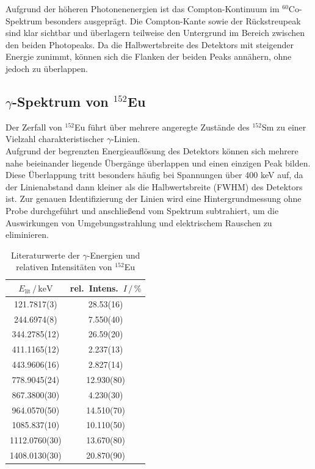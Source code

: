 Aufgrund der höheren Photonenenergien ist das Compton-Kontinuum im
$^{60}$Co-Spektrum besonders ausgeprägt. Die Compton-Kante sowie der
Rückstreupeak sind klar sichtbar und überlagern teilweise den Untergrund im
Bereich zwischen den beiden Photopeaks. Da die Halbwertsbreite des Detektors
mit steigender Energie zunimmt, können sich die Flanken der beiden Peaks
annähern, ohne jedoch zu überlappen.\cite{Siegbahn}\cite{Knoll}


\subsection{$\gamma$-Spektrum von $^{152}$Eu}
Der Zerfall von $^{152}$Eu führt über mehrere angeregte Zustände des $^{152}$Sm zu einer Vielzahl charakteristischer $\gamma$-Linien.\\
Aufgrund der begrenzten Energieauflösung des Detektors können sich mehrere nahe beieinander liegende Übergänge überlappen und einen einzigen Peak bilden. 
Diese Überlappung tritt besonders häufig bei Spannungen über 400 keV auf, da der Linienabstand dann kleiner als die Halbwertsbreite (FWHM) des Detektors ist.
Zur genauen Identifizierung der Linien wird eine Hintergrundmessung ohne Probe durchgeführt und anschließend vom Spektrum subtrahiert, um die Auswirkungen von Umgebungsstrahlung und elektrischem Rauschen zu eliminieren.\cite{Siegbahn}\cite{Knoll}
\begin{table}[H]
\centering
\caption{Literaturwerte der $\gamma$-Energien und relativen Intensitäten von $^{152}$Eu \cite{NuDat3}}
\begin{tabular}{c c}
\hline
$E_{\text{lit}}\,/\,\mathrm{keV}$ & rel.\ Intens.\ $I\,/\,\%$ \\
\hline
121.7817(3)  & 28.53(16) \\
244.6974(8)  & 7.550(40) \\
344.2785(12) & 26.59(20) \\
411.1165(12) & 2.237(13) \\
443.9606(16) & 2.827(14) \\
778.9045(24) & 12.930(80) \\
867.3800(30) & 4.230(30) \\
964.0570(50) & 14.510(70) \\
1085.837(10) & 10.110(50) \\
1112.0760(30) & 13.670(80) \\
1408.0130(30) & 20.870(90) \\
\hline
\end{tabular}
\label{tab_eff_1}
\end{table}



